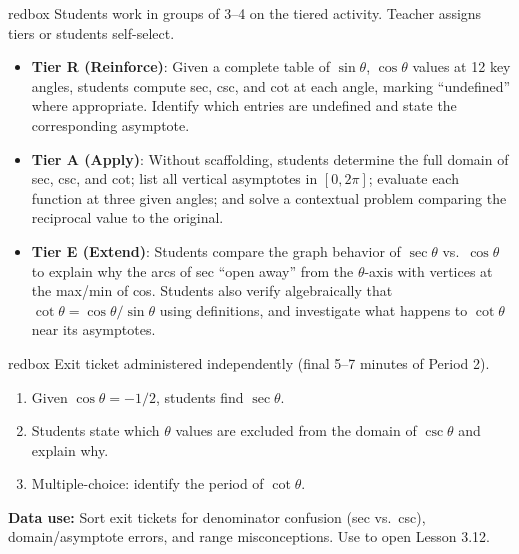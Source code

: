 \documentclass[10pt]{article}
\begin{document}
\begin{skillbox}{redbox}
Students work in groups of 3--4 on the tiered activity. Teacher assigns tiers
or students self-select.

\begin{itemize}[leftmargin=1.4em, itemsep=4pt]
  \item \textbf{Tier R (Reinforce)}: Given a complete table of $\sin\theta$,
    $\cos\theta$ values at 12 key angles, students compute sec, csc, and cot
    at each angle, marking ``undefined'' where appropriate. Identify which
    entries are undefined and state the corresponding asymptote.
  \item \textbf{Tier A (Apply)}: Without scaffolding, students determine the
    full domain of sec, csc, and cot; list all vertical asymptotes in $[0,2\pi]$;
    evaluate each function at three given angles; and solve a contextual problem
    comparing the reciprocal value to the original.
  \item \textbf{Tier E (Extend)}: Students compare the graph behavior of
    $\sec\theta$ vs.\ $\cos\theta$ to explain why the arcs of sec ``open away''
    from the $\theta$-axis with vertices at the max/min of cos. Students also
    verify algebraically that $\cot\theta = \cos\theta/\sin\theta$ using
    definitions, and investigate what happens to $\cot\theta$ near its asymptotes.
\end{itemize}
\end{skillbox}

\vspace{0.08in}

\begin{skillbox}{redbox}
Exit ticket administered independently (final 5--7 minutes of Period 2).

\begin{enumerate}[leftmargin=1.4em, itemsep=4pt]
  \item Given $\cos\theta = -1/2$, students find $\sec\theta$.
  \item Students state which $\theta$ values are excluded from the domain of
    $\csc\theta$ and explain why.
  \item Multiple-choice: identify the period of $\cot\theta$.
\end{enumerate}

\textbf{Data use:} Sort exit tickets for denominator confusion (sec vs.\ csc),
domain/asymptote errors, and range misconceptions. Use to open Lesson 3.12.
\end{skillbox}
\end{document}
